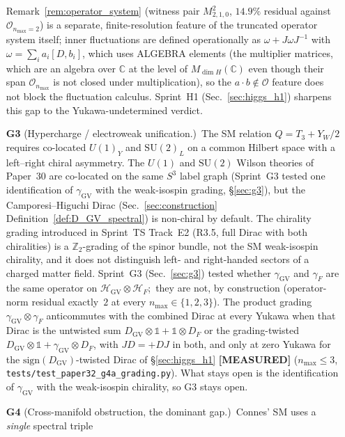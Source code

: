 \documentclass[11pt]{article}
\begin{document}
\begin{enumerate}
Remark~\ref{rem:operator_system} (witness pair $M_{2,1,0}^2$,
$14.9\%$ residual against $\mathcal{O}_{n_{\max}=2}$) is a separate,
finite-resolution feature of the truncated operator system itself;
inner fluctuations are defined operationally as $\omega + J\omega
J^{-1}$ with $\omega = \sum_i a_i [D, b_i]$, which uses ALGEBRA
elements (the multiplier matrices, which are an algebra over
$\mathbb{C}$ at the level of $M_{\dim H}(\mathbb{C})$ even though
their span $\mathcal{O}_{n_{\max}}$ is not closed under multiplication),
so the $a \cdot b \notin \mathcal{O}$ feature does not block the
fluctuation calculus.
Sprint~H1 (Sec.~\ref{sec:higgs_h1}) sharpens this gap to the
Yukawa-undetermined verdict.
\item[\textbf{G3}] (Hypercharge / electroweak unification.)\ The SM
relation $Q = T_3 + Y_W/2$ requires co-located $U(1)_Y$ and
$\mathrm{SU}(2)_L$ on a common Hilbert space with a left--right
chiral asymmetry.  The $U(1)$ and $\mathrm{SU}(2)$ Wilson theories
of Paper~30 are co-located on the same $S^3$ label graph (Sprint~G3 tested one identification of $\gamma_{\mathrm{GV}}$ with the weak-isospin grading, \S\ref{sec:g3}), but
the Camporesi--Higuchi Dirac (Sec.~\ref{sec:construction}
Definition~\ref{def:D_GV_spectral}) is non-chiral by default.  The
chirality grading introduced in Sprint~TS Track~E2 (R3.5, full
Dirac with both chiralities) is a $\mathbb{Z}_2$-grading of the
spinor bundle, not the SM weak-isospin chirality, and it does not
distinguish left- and right-handed sectors of a charged matter
field.
Sprint~G3 (Sec.~\ref{sec:g3}) tested whether $\gamma_{\mathrm{GV}}$
and $\gamma_F$ are the same operator on $\mathcal{H}_{\mathrm{GV}}
\otimes \mathcal{H}_F$;\ they are not, by construction (operator-norm
residual exactly~$2$ at every $n_{\max} \in \{1, 2, 3\}$).  The product
grading $\gamma_{\mathrm{GV}} \otimes \gamma_F$ anticommutes with the
combined Dirac at every Yukawa when that Dirac is the untwisted sum
$D_{\mathrm{GV}} \otimes \mathbb{1} + \mathbb{1} \otimes D_F$ or the
grading-twisted $D_{\mathrm{GV}} \otimes \mathbb{1} + \gamma_{\mathrm{GV}}
\otimes D_F$, with $JD = +DJ$ in both, and only at zero Yukawa for the
$\mathrm{sign}(D_{\mathrm{GV}})$-twisted Dirac of \S\ref{sec:higgs_h1}
\textbf{[MEASURED]} ($n_{\max} \le 3$,
\texttt{tests/test\_paper32\_g4a\_grading.py}).  What stays open is the
identification of $\gamma_{\mathrm{GV}}$ with the weak-isospin chirality,
so G3 stays open.
\item[\textbf{G4}] (Cross-manifold obstruction, the dominant gap.)\
Connes' SM uses a \emph{single} spectral triple

\end{enumerate}
\end{document}
